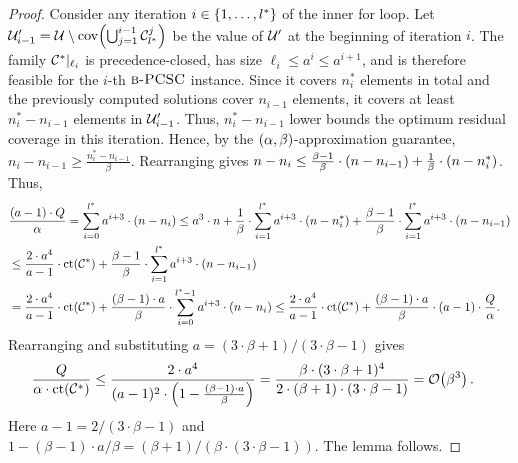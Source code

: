 \begin{proof}
        Consider any iteration $i\in \mathopen{}\left\{ 1,\dots,l^* \right\}$ of the inner for loop. Let $\mathcal{U}'_{i-1}=\mathcal{U}\setminus\operatorname{cov}\mathopen{}\left( \bigcup_{j=1}^{i-1}\mathcal{C}_{l^*}^j \right)$ be the value of $\mathcal{U}'$ at the beginning of iteration $i$. The family $\mathcal{C}^{*}|_{\ell_i}$ is precedence-closed, has size $\ell_i\leq a^i\leq a^{i+1}$, and is therefore feasible for the $i$-th $\textup{\textsc{b-PCSC}}$ instance. Since it covers $n_i^*$ elements in total and the previously computed solutions cover $n_{i-1}$ elements, it covers at least $n_i^*-n_{i-1}$ elements in $\mathcal{U}'_{i-1}$.
        Thus, $n_i^*-n_{i-1}$ lower bounds the optimum residual coverage in this iteration.
        Hence, by the $\mathopen{}\left( \alpha,\beta \right)$-approximation guarantee, $n_i-n_{i-1}\geq\frac{n_i^*-n_{i-1}}{\beta}$. Rearranging gives $n-n_i\leq\frac{\beta-1}{\beta}\cdot\mathopen{}\left( n-n_{i-1} \right)+\frac{1}{\beta}\cdot\mathopen{}\left( n-n_i^* \right)$.
        Thus,
        \begin{align*}
            &\frac{\mathopen{}\left( a-1 \right)\cdot Q}{\alpha}
            =
            \sum_{i=0}^{l^*}a^{i+3}\cdot \mathopen{}\left( n-n_i \right) \leq
            a^3\cdot n + \frac{1}{\beta}\cdot\sum_{i=1}^{l^*}a^{i+3}\cdot \mathopen{}\left( n-n_i^* \right) + \frac{\beta-1}{\beta}\cdot\sum_{i=1}^{l^*}a^{i+3}\cdot \mathopen{}\left( n-n_{i-1} \right)
            \\&\leq
            \frac{2\cdot a^4}{a-1}\cdot\operatorname{ct}\mathopen{}\left( \mathcal{C}^{*} \right)+\frac{\beta-1}{\beta}\cdot\sum_{i=1}^{l^*}a^{i+3}\cdot \mathopen{}\left( n-n_{i-1} \right)
            \\&=
            \frac{2\cdot a^4}{a-1}\cdot\operatorname{ct}\mathopen{}\left( \mathcal{C}^{*} \right)+\frac{\mathopen{}\left( \beta-1 \right)\cdot a}{\beta}\cdot\sum_{i=0}^{l^*-1}a^{i+3}\cdot \mathopen{}\left( n-n_{i} \right) \leq
            \frac{2\cdot a^4}{a-1}\cdot\operatorname{ct}\mathopen{}\left( \mathcal{C}^{*} \right)+\frac{\mathopen{}\left( \beta-1 \right)\cdot a}{\beta}\cdot\mathopen{}\left( a-1 \right)\cdot\frac{Q}{\alpha}.
        \end{align*}
        Rearranging and substituting $a=(3\cdot\beta+1)/(3\cdot\beta-1)$ gives
        \begin{align*}
            \frac{Q}{\alpha\cdot\operatorname{ct}\mathopen{}\left( \mathcal{C}^{*} \right)}
            &\leq \frac{2\cdot a^4}{(a-1)^2\cdot\mathopen{}\left( 1-\frac{(\beta-1)\cdot a}{\beta} \right)}
            =\frac{\beta\cdot(3\cdot\beta+1)^4}{2\cdot(\beta+1)\cdot(3\cdot\beta-1)}
            =\mathcal{O}\mathopen{}\left( \beta^3 \right).
        \end{align*}
        Here $a-1=2/(3\cdot\beta-1)$ and $1-(\beta-1)\cdot a/\beta=(\beta+1)/(\beta\cdot(3\cdot\beta-1))$.
        The lemma follows.
    \end{proof}

